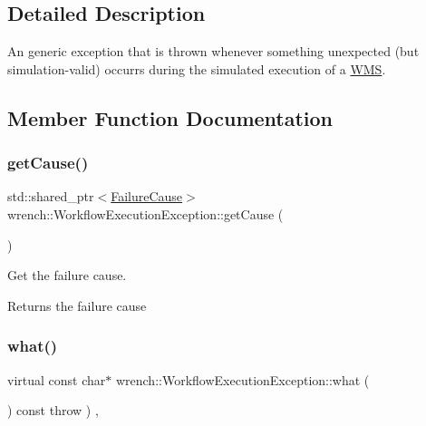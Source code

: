 \subsection{Detailed Description}
An generic exception that is thrown whenever something unexpected (but simulation-\/valid) occurrs during the simulated execution of a \hyperlink{classwrench_1_1_w_m_s}{W\+MS}. 

\subsection{Member Function Documentation}
\mbox{\label{classwrench_1_1_workflow_execution_exception_a45fbbd2bc144da41f1fd09efcdaa2481}} 
\subsubsection{\texorpdfstring{get\+Cause()}{getCause()}}
{\footnotesize\ttfamily std\+::shared\+\_\+ptr$<$\hyperlink{classwrench_1_1_failure_cause}{Failure\+Cause}$>$ wrench\+::\+Workflow\+Execution\+Exception\+::get\+Cause (\begin{DoxyParamCaption}{ }\end{DoxyParamCaption})\hspace{0.3cm}{\ttfamily [inline]}}



Get the failure cause. 

\begin{DoxyReturn}{Returns}
the failure cause 
\end{DoxyReturn}
\mbox{\label{classwrench_1_1_workflow_execution_exception_a54f37236e3bfd00490835675220863c4}} 
\subsubsection{\texorpdfstring{what()}{what()}}
{\footnotesize\ttfamily virtual const char$\ast$ wrench\+::\+Workflow\+Execution\+Exception\+::what (\begin{DoxyParamCaption}{ }\end{DoxyParamCaption}) const throw  ) \hspace{0.3cm}{\ttfamily [inline]}, {\ttfamily [virtual]}}



